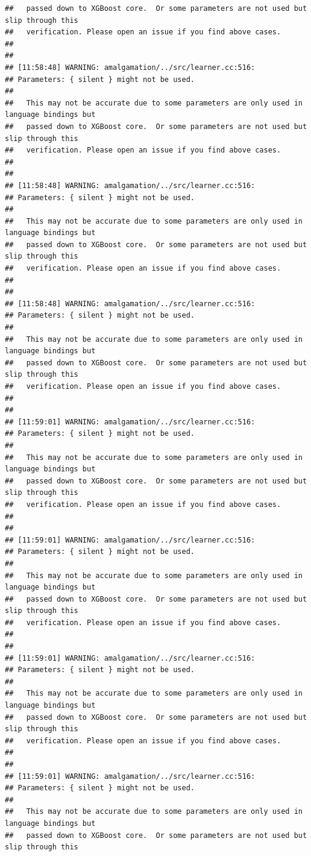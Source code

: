 \documentclass[AMS,STIX2COL]{WileyNJD-v2}\usepackage[]{graphicx}\usepackage[]{color}
\makeatletter
\newenvironment{kframe}{%
 \def\at@end@of@kframe{}%
 \ifinner\ifhmode%
  \def\at@end@of@kframe{\end{minipage}}%
  \begin{minipage}{\columnwidth}%
 \fi\fi%
 \def\FrameCommand##1{\hskip\@totalleftmargin \hskip-\fboxsep
 \colorbox{shadecolor}{##1}\hskip-\fboxsep
     \hskip-\linewidth \hskip-\@totalleftmargin \hskip\columnwidth}%
 \MakeFramed {\advance\hsize-\width
   \@totalleftmargin\z@ \linewidth\hsize
   \@setminipage}}%
 {\par\unskip\endMakeFramed%
 \at@end@of@kframe}
\newenvironment{knitrout}{}{} %
\makeatother
\begin{document}
\begin{knitrout}
\begin{kframe}
\begin{verbatim}
##   passed down to XGBoost core.  Or some parameters are not used but slip through this
##   verification. Please open an issue if you find above cases.
## 
## 
## [11:58:48] WARNING: amalgamation/../src/learner.cc:516: 
## Parameters: { silent } might not be used.
## 
##   This may not be accurate due to some parameters are only used in language bindings but
##   passed down to XGBoost core.  Or some parameters are not used but slip through this
##   verification. Please open an issue if you find above cases.
## 
## 
## [11:58:48] WARNING: amalgamation/../src/learner.cc:516: 
## Parameters: { silent } might not be used.
## 
##   This may not be accurate due to some parameters are only used in language bindings but
##   passed down to XGBoost core.  Or some parameters are not used but slip through this
##   verification. Please open an issue if you find above cases.
## 
## 
## [11:58:48] WARNING: amalgamation/../src/learner.cc:516: 
## Parameters: { silent } might not be used.
## 
##   This may not be accurate due to some parameters are only used in language bindings but
##   passed down to XGBoost core.  Or some parameters are not used but slip through this
##   verification. Please open an issue if you find above cases.
## 
## 
## [11:59:01] WARNING: amalgamation/../src/learner.cc:516: 
## Parameters: { silent } might not be used.
## 
##   This may not be accurate due to some parameters are only used in language bindings but
##   passed down to XGBoost core.  Or some parameters are not used but slip through this
##   verification. Please open an issue if you find above cases.
## 
## 
## [11:59:01] WARNING: amalgamation/../src/learner.cc:516: 
## Parameters: { silent } might not be used.
## 
##   This may not be accurate due to some parameters are only used in language bindings but
##   passed down to XGBoost core.  Or some parameters are not used but slip through this
##   verification. Please open an issue if you find above cases.
## 
## 
## [11:59:01] WARNING: amalgamation/../src/learner.cc:516: 
## Parameters: { silent } might not be used.
## 
##   This may not be accurate due to some parameters are only used in language bindings but
##   passed down to XGBoost core.  Or some parameters are not used but slip through this
##   verification. Please open an issue if you find above cases.
## 
## 
## [11:59:01] WARNING: amalgamation/../src/learner.cc:516: 
## Parameters: { silent } might not be used.
## 
##   This may not be accurate due to some parameters are only used in language bindings but
##   passed down to XGBoost core.  Or some parameters are not used but slip through this

\end{verbatim}
\end{kframe}
\end{knitrout}
\end{document}
